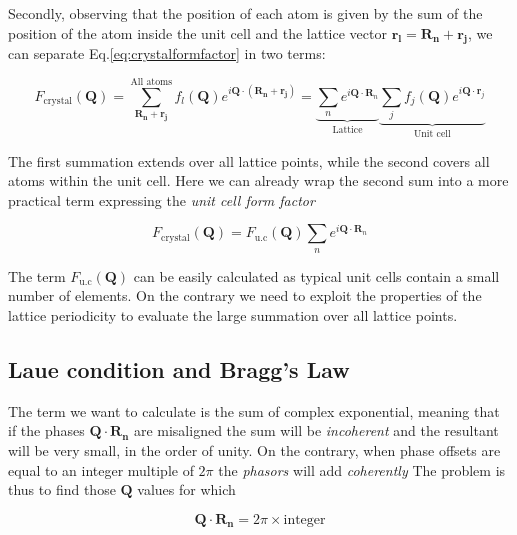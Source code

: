 Secondly, observing that the position of each atom is given by the sum of the position of the atom inside the unit cell 
and the lattice vector $\mathbf{r_l} = \mathbf{R_n} + \mathbf{r_j}$, we can separate Eq.\ref{eq:crystalformfactor} in two terms: 

\begin{equation}
    F_{\text{crystal}}(\mathbf{Q}) = 
   \sum_{\mathbf{R_n} + \mathbf{r_j}}^{\text{All atoms}} f_l(\mathbf Q) e^{i \mathbf{Q} \cdot (\mathbf{R_n} + \mathbf{r_j})} = 
    \underbrace{\sum_{n} e^{i \mathbf{Q} \cdot \mathbf{R}_n}}_{\text{Lattice}}
    \underbrace{\sum_{j} f_j(\mathbf{Q}) e^{i \mathbf{Q} \cdot \mathbf{r}_j}}_{\text{Unit cell}}
   \label{eq:crystalformfactor2}
\end{equation} 

The first summation extends over all lattice points, while the second covers all atoms within the unit cell. 
Here we can already wrap the second sum into a more practical term expressing the \textit{unit cell form factor} 

\begin{equation}
    F_{\text{crystal}}(\mathbf{Q}) =  F_{\text{u.c}}(\mathbf{Q}) \sum_{n} e^{i \mathbf{Q} \cdot \mathbf{R}_n}
   \label{eq:crystalformfactor3}
\end{equation}

The term $ F_{\text{u.c}}(\mathbf{Q}) $ can be easily calculated as typical unit cells contain a small number of elements.
On the contrary we need to exploit the properties of the lattice periodicity to evaluate the large summation over all lattice 
points. 


\subsection{Laue condition and Bragg's Law} 

The term we want to calculate is the sum of complex exponential, meaning that if the phases $\mathbf{Q} \cdot \mathbf{R_n}$ 
are misaligned the sum will be \textit{incoherent} and the resultant will be very small, in the order of unity. 
On the contrary, when phase offsets are equal to an integer multiple of $2\pi$ the \textit{phasors} will add \textit{coherently} 
The problem is thus to find those $\mathbf{Q}$ values for which

\begin{equation}
   \mathbf{Q} \cdot \mathbf{R_n} = 2\pi \times \text{integer}
   \label{eq:laue}
\end{equation}


